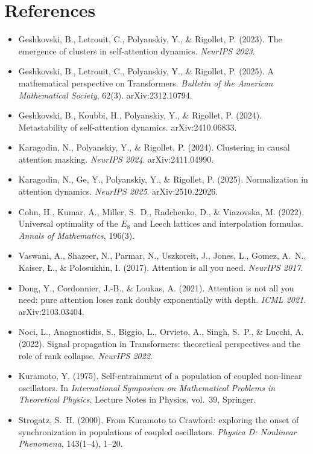 \documentclass[11pt]{article}
\begin{document}
\section*{References}
\begin{itemize}[leftmargin=*]
\item Geshkovski, B., Letrouit, C., Polyanskiy, Y., \& Rigollet, P. (2023). The emergence of clusters in self-attention dynamics. \emph{NeurIPS 2023}.
\item Geshkovski, B., Letrouit, C., Polyanskiy, Y., \& Rigollet, P. (2025). A mathematical perspective on Transformers. \emph{Bulletin of the American Mathematical Society}, 62(3). arXiv:2312.10794.
\item Geshkovski, B., Koubbi, H., Polyanskiy, Y., \& Rigollet, P. (2024). Metastability of self-attention dynamics. arXiv:2410.06833.
\item Karagodin, N., Polyanskiy, Y., \& Rigollet, P. (2024). Clustering in causal attention masking. \emph{NeurIPS 2024}. arXiv:2411.04990.
\item Karagodin, N., Ge, Y., Polyanskiy, Y., \& Rigollet, P. (2025). Normalization in attention dynamics. \emph{NeurIPS 2025}. arXiv:2510.22026.
\item Cohn, H., Kumar, A., Miller, S.\ D., Radchenko, D., \& Viazovska, M. (2022). Universal optimality of the $E_8$ and Leech lattices and interpolation formulas. \emph{Annals of Mathematics}, 196(3).
\item Vaswani, A., Shazeer, N., Parmar, N., Uszkoreit, J., Jones, L., Gomez, A.\ N., Kaiser, {\L}., \& Polosukhin, I. (2017). Attention is all you need. \emph{NeurIPS 2017}.
\item Dong, Y., Cordonnier, J.-B., \& Loukas, A. (2021). Attention is not all you need: pure attention loses rank doubly exponentially with depth. \emph{ICML 2021}. arXiv:2103.03404.
\item Noci, L., Anagnostidis, S., Biggio, L., Orvieto, A., Singh, S.\ P., \& Lucchi, A. (2022). Signal propagation in Transformers: theoretical perspectives and the role of rank collapse. \emph{NeurIPS 2022}.
\item Kuramoto, Y. (1975). Self-entrainment of a population of coupled non-linear oscillators. In \emph{International Symposium on Mathematical Problems in Theoretical Physics}, Lecture Notes in Physics, vol.\ 39, Springer.
\item Strogatz, S.\ H. (2000). From Kuramoto to Crawford: exploring the onset of synchronization in populations of coupled oscillators. \emph{Physica D: Nonlinear Phenomena}, 143(1--4), 1--20.

\end{itemize}
\end{document}
